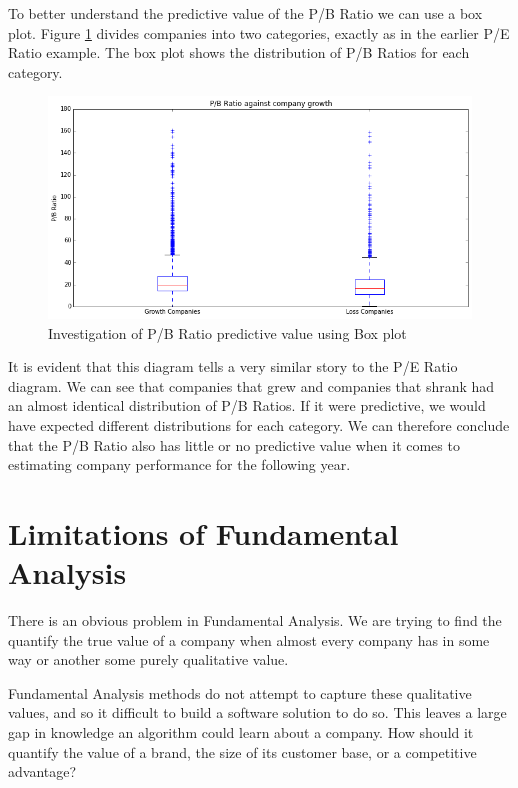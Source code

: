 \documentclass{report}
\begin{document}
To better understand the predictive value of the P/B Ratio we can use a box plot. Figure \ref{fig:pb-box} divides companies into two categories, exactly as in the earlier P/E Ratio example. The box plot shows the distribution of P/B Ratios for each category.

\begin{figure}[H]
	\caption{Investigation of P/B Ratio predictive value using Box plot}
	\centerline{\includegraphics[width=\textwidth]{vis/pb_box.png}}
	\label{fig:pb-box}
\end{figure}

It is evident that this diagram tells a very similar story to the P/E Ratio diagram. We can see that companies that grew and companies that shrank had an almost identical distribution of P/B Ratios. If it were predictive, we would have expected different distributions for each category. We can therefore conclude that the P/B Ratio also has little or no predictive value when it comes to estimating company performance for the following year.

\section{Limitations of Fundamental Analysis}

There is an obvious problem in Fundamental Analysis. We are trying to find the quantify the true value of a company when almost every company has in some way or another some purely qualitative value.

Fundamental Analysis methods do not attempt to capture these qualitative values, and so it difficult to build a software solution to do so. This leaves a large gap in knowledge an algorithm could learn about a company. How should it quantify the value of a brand, the size of its customer base, or a competitive advantage?
\end{document}
